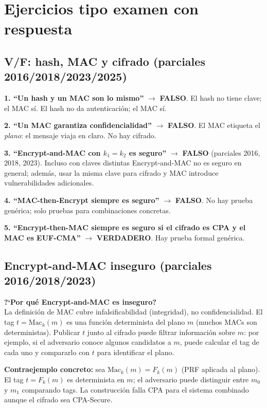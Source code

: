 \documentclass[11pt,a4paper]{article}
\begin{document}
\section{Ejercicios tipo examen con respuesta}

\subsection{V/F: hash, MAC y cifrado (parciales 2016/2018/2023/2025)}

\begin{examen}
\textbf{1. ``Un hash y un MAC son lo mismo''} $\to$ \textbf{FALSO}.
El hash no tiene clave; el MAC s\'i.  El hash no da autenticaci\'on; el MAC s\'i.

\textbf{2. ``Un MAC garantiza confidencialidad''} $\to$ \textbf{FALSO}.
El MAC etiqueta el \emph{plano}: el mensaje viaja en claro.  No hay cifrado.

\textbf{3. ``Encrypt-and-MAC con $k_1=k_2$ es seguro''} $\to$
\textbf{FALSO} (parciales 2016, 2018, 2023).
Incluso con claves distintas Encrypt-and-MAC no es seguro en general; adem\'as,
usar la misma clave para cifrado y MAC introduce vulnerabilidades adicionales.

\textbf{4. ``MAC-then-Encrypt siempre es seguro''} $\to$ \textbf{FALSO}.
No hay prueba gen\'erica; solo pruebas para combinaciones concretas.

\textbf{5. ``Encrypt-then-MAC siempre es seguro si el cifrado es CPA y el MAC es
EUF-CMA''} $\to$ \textbf{VERDADERO}.  Hay prueba formal gen\'erica.
\end{examen}

\subsection{Encrypt-and-MAC inseguro (parciales 2016/2018/2023)}

\begin{examen}
\textbf{?`Por qu\'e Encrypt-and-MAC es inseguro?}\\
La definici\'on de MAC cubre infalsificabilidad (integridad), no
confidencialidad.  El tag $t = \mathrm{Mac}_k(m)$ es una funci\'on determinista
del plano $m$ (muchos MACs son deterministas).  Publicar $t$ junto al cifrado
puede filtrar informaci\'on sobre $m$: por ejemplo, si el adversario conoce algunos
candidatos a $m$, puede calcular el tag de cada uno y compararlo con $t$ para
identificar el plano.

\textbf{Contraejemplo concreto:} sea $\mathrm{Mac}_k(m) = F_k(m)$ (PRF aplicada
al plano).  El tag $t = F_k(m)$ es determinista en $m$; el adversario puede
distinguir entre $m_0$ y $m_1$ comparando tags.  La construcci\'on falla CPA para
el sistema combinado aunque el cifrado sea CPA-Secure.
\end{examen}
\end{document}
